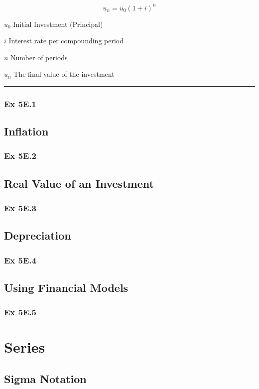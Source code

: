 \documentclass[12pt]{article}
\begin{document}
\LARGE $$u_n = u_0(1+i)^n$$ \normalsize

\hspace{1cm}$u_0$ Initial Investment (Principal)

\hspace{1cm}$i$ Interest rate per compounding period

\hspace{1cm}$n$ Number of periods

\hspace{1cm}$u_n$ The final value of the investment

\vspace{0.5cm}\hrule
\subsubsection{Ex 5E.1}
\subsection{Inflation}
\subsubsection{Ex 5E.2}
\subsection{Real Value of an Investment}
\subsubsection{Ex 5E.3}
\subsection{Depreciation}
\subsubsection{Ex 5E.4}
\subsection{Using Financial Models}
\subsubsection{Ex 5E.5}
\section{Series}
\subsection{Sigma Notation}
\end{document}
